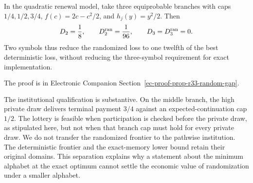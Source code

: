 \begin{proposition}\label{prop:r33-random-gap}
In the quadratic renewal model, take three equiprobable branches with caps $1/4,1/2,3/4$, $f(c)=2c-c^2/2$, and $h_j(y)=y^2/2$. Then
\begin{equation}\label{eq:r33-gap}
 D_2=\frac18,\qquad D_2^{\rm ran}=\frac1{96},\qquad D_3=D_3^{\rm ran}=0.
\end{equation}
Two symbols thus reduce the randomized loss to one twelfth of the best deterministic loss, without reducing the three-symbol requirement for exact implementation.
\end{proposition}
\noindent The proof is in Electronic Companion Section~\ref{ec-proof-prop-r33-random-gap}.


The institutional qualification is substantive. On the middle branch, the high private draw delivers terminal payment $3/4$ against an expected-continuation cap $1/2$. The lottery is feasible when participation is checked before the private draw, as stipulated here, but not when that branch cap must hold for every private draw. We do not transfer the randomized frontier to the pathwise institution. The deterministic frontier and the exact-memory lower bound retain their original domains. This separation explains why a statement about the minimum alphabet at the exact optimum cannot settle the economic value of randomization under a smaller alphabet.

